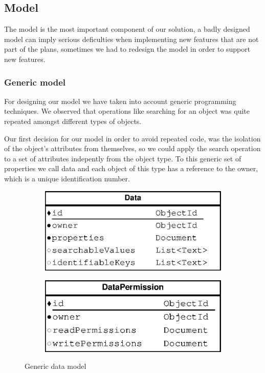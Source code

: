 \subsection{Model}
The model is the most important component of our solution, a badly designed model can imply serious deficulties when implementing new features that are not part of the plans, sometimes we had to redesign the model in order to support new features.

\subsubsection {Generic model}

For designing our model we have taken into account generic programming techniques. We observed that operations like searching for an object was quite repeated amongst different types of objects. 

Our first decision for our model in order to avoid repeated code, was the isolation of the object's attributes from themselves, so we could apply the search operation to a set of attributes indepently from the object type. To this generic set of properties we call data and each object of this type has a reference to the owner, which is a unique identification number.

\begin{figure}[H]
    \centering
    \begin{subfigure}[b]{0.35\textwidth}
    	\includegraphics[width=\textwidth]{figures/model_data}
    \end{subfigure}
    \begin{subfigure}[b]{0.35\textwidth}
    	\includegraphics[width=\textwidth]{figures/model_data_permission}
    \end{subfigure}
    \caption{Generic data model}
\end{figure} 

